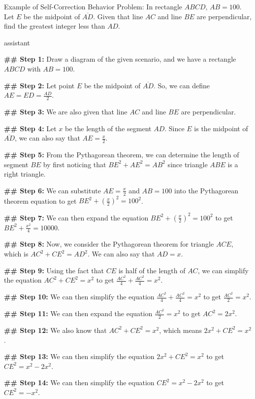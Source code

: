 \begin{promptbox}{Example of Self-Correction Behavior}
Problem: In rectangle $ABCD$, $AB=100$. Let $E$ be the midpoint of $\overline{AD}$. Given that line $AC$ and line $BE$ are perpendicular, find the greatest integer less than $AD$.

assistant

\textbf{\#\# Step 1:}
Draw a diagram of the given scenario, and we have a rectangle $ABCD$ with $AB=100$.

\textbf{\#\# Step 2:}
Let point $E$ be the midpoint of $\overline{AD}$. So, we can define $AE=ED=\frac{AD}{2}$.

\textbf{\#\# Step 3:}
We are also given that line $AC$ and line $BE$ are perpendicular.

\textbf{\#\# Step 4:}
Let $x$ be the length of the segment $AD$. Since $E$ is the midpoint of $\overline{AD}$, we can also say that $AE=\frac{x}{2}$.

\textbf{\#\# Step 5:}
From the Pythagorean theorem, we can determine the length of segment $BE$ by first noticing that $BE^2+AE^2=AB^2$ since triangle $ABE$ is a right triangle.

\textbf{\#\# Step 6:}
We can substitute $AE=\frac{x}{2}$ and $AB=100$ into the Pythagorean theorem equation to get $BE^2+\left(\frac{x}{2}\right)^2=100^2$.

\textbf{\#\# Step 7:}
We can then expand the equation $BE^2+\left(\frac{x}{2}\right)^2=100^2$ to get $BE^2+\frac{x^2}{4}=10000$.

\textbf{\#\# Step 8:}
Now, we consider the Pythagorean theorem for triangle $ACE$, which is $AC^2+CE^2=AD^2$. We can also say that $AD=x$.

\textbf{\#\# Step 9:}
Using the fact that $CE$ is half of the length of $AC$, we can simplify the equation $AC^2+CE^2=x^2$ to get $\frac{AC^2}{4}+\frac{AC^2}{4}=x^2$.

\textbf{\#\# Step 10:}
We can then simplify the equation $\frac{AC^2}{4}+\frac{AC^2}{4}=x^2$ to get $\frac{AC^2}{2}=x^2$.

\textbf{\#\# Step 11:}
We can then expand the equation $\frac{AC^2}{2}=x^2$ to get $AC^2=2x^2$.

\textbf{\#\# Step 12:}
We also know that $AC^2+CE^2=x^2$, which means $2x^2+CE^2=x^2$.

\textbf{\#\# Step 13:}
We can then simplify the equation $2x^2+CE^2=x^2$ to get $CE^2=x^2-2x^2$.

\textbf{\#\# Step 14:}
We can then simplify the equation $CE^2=x^2-2x^2$ to get $CE^2=-x^2$.


\end{promptbox}
